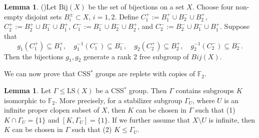 \documentclass[12pt]{amsart}
\numberwithin{equation}{subsection}
\theoremstyle{definition}
\newtheorem{lemma}[theorem]{Lemma}
\theoremstyle{definition}
\theoremstyle{remark}
\begin{document}
\begin{lemma}(\cite[Lemma 7.60]{DrutuKapovich2018})\label{lemma:pingpong}
    Let $\text{Bij}(X)$ be the set of bijections on a set $X$. Choose four non-empty disjoint sets $B_i^\pm \subset X$, $i=1,2$. Define  $C^+_1 := B_1^+\cup B_2^-\cup B_2^+$,  $C^+_2 := B_2^+\cup B_1^-\cup B_1^+$, $C^-_1 := B_1^-\cup B_2^-\cup B_2^+$, and $C^-_2 := B_2^-\cup B_1^-\cup B_1^+$. Suppose that
    $$g_1(C^+_1) \subseteq B^+_1,\quad g_1^{-1}(C_1^-) \subseteq B^-_1, \quad g_2(C^+_2) \subseteq B^+_2, \quad g_2^{-1}(C_2^-) \subseteq B^-_2. $$
    Then the bijections $g_1, g_2$ generate a rank 2 free subgroup of $Bij(X)$. 
\end{lemma}

We can now prove that CSS$^*$ groups are replete with copies of $\mathbb F_2$. 

\begin{lemma}\label{lemma:freesubgroup} 
    Let $\Gamma \leq \text{LS}(X)$ be a CSS$^*$ group. Then $\Gamma$ contains subgroups $K$ isomorphic to $\mathbb F_2$. More precisely, for a stabilizer subgroup $\Gamma_U$, where $U$ is an infinite proper clopen subset of $X$, then $K$ can be chosen in $\Gamma$ such that (1) $K \cap \Gamma_U = \{1\}$ and  $[K,\Gamma_U] = \{1\}$. If we further assume that $X \setminus U$ is infinite, then $K$ can be chosen in $\Gamma$ such that (2) $K \leq \Gamma_U$.
     
\end{lemma}
\end{document}
